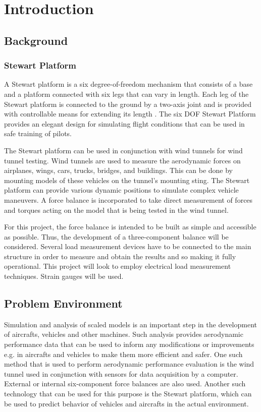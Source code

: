 \section{Introduction}
\label{sec:introduction}
\subsection{Background}
\subsubsection{Stewart Platform}
A Stewart platform is a six degree-of-freedom mechanism that consists of a base and a platform connected with six legs that can vary in length. Each leg of the Stewart platform is connected to the ground by a two-axis joint and is provided with controllable means for extending its length
\cite{wittenburg2016stewart}. The six DOF Stewart Platform provides an elegant design for simulating flight conditions that can be used in safe training of pilots\cite{stewart1965platform}. 

The Stewart platform can be used in conjunction with wind tunnels for wind tunnel testing. Wind tunnels are used to measure the aerodynamic forces on airplanes, wings, cars, trucks, bridges, and buildings. This can be done by mounting models of these vehicles on the tunnel's mounting sting. The Stewart platform can provide various dynamic positions to simulate complex vehicle maneuvers. A force balance is incorporated to take direct measurement of forces and torques acting on the model that is being tested in the wind tunnel.

For this project, the force balance is intended to be built as simple and accessible as possible. Thus, the development of a three-component balance will be considered. Several load measurement devices have to be connected to the main structure in order to measure and obtain the results and so making it fully operational. This project will look to employ electrical load measurement techniques. Strain gauges will be used.

\subsection{Problem Environment}
Simulation and analysis of scaled models is an important step in the development of aircrafts, vehicles and other machines. Such analysis provides aerodynamic performance data that can be used to inform any modifications or improvements e.g. in aircrafts and vehicles to make them more efficient and safer. One such method that is used to perform aerodynamic performance evaluation is the wind tunnel used in conjunction with sensors for data acquisition by a computer. External or internal six-component force balances are also used. Another such technology that can be used for this purpose is the Stewart platform, which can be used to predict behavior of vehicles and aircrafts in the actual environment.

